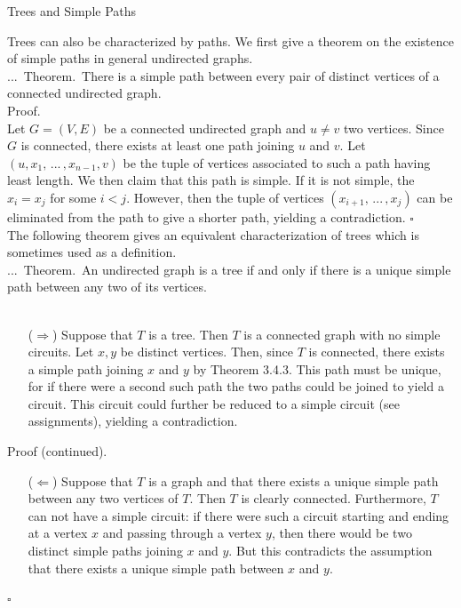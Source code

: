 \documentclass[smaller,hyperref={CJKbookmarks=true}]{beamer}
\newenvironment{PROOF}{{\noindent\!\sf\alert{Proof.}}\\}{\hfill$\square$\\}
\newcounter{zhuo}[subsection]
\renewcommand{\thezhuo}{\thesection.\thesubsection.\arabic{zhuo}}
\newenvironment{THEOREM}{\stepcounter{zhuo}\alert{\thezhuo.~Theorem.\,}}{}
\begin{document}
\begin{frame}{Trees and Simple Paths}
\begin{spacing}{1.1}
Trees can also be characterized by paths. We first give a theorem on the
existence of simple paths in general undirected graphs.\\[6pt]
\begin{THEOREM}
There is a simple path between every pair of distinct
vertices of a connected undirected graph.\\[6pt]
\end{THEOREM}
\begin{PROOF}
Let $G=(V,E)$ be a connected undirected graph and $u\neq v$ two vertices. Since $G$ is connected, there exists at least one path joining $u$ and $v$. Let $(u,x_1,\,...\,,x_{n-1},v)$ be the tuple of vertices associated to such a path
having least length. We then claim that this path is simple. If it is not
simple, the $x_i=x_j$ for some $i<j$. However, then the tuple of vertices $(x_{i+1},\,...\,,x_j)$ can be eliminated from the path to give a shorter path,
yielding a contradiction.
\end{PROOF}
\newpage
The following theorem gives an equivalent characterization of trees which
is sometimes used as a definition.\\[6pt]
\begin{THEOREM}
An undirected graph is a tree if and only if there is a
unique simple path between any two of its vertices.\\[6pt]
\end{THEOREM}
\begin{PROOF}
\begin{itemize}
  \item[($\Rightarrow$)] Suppose that $T$ is a tree. Then $T$ is a connected graph with no simple circuits. Let $x, y$ be distinct vertices. Then, since $T$ is connected, there exists a simple path joining $x$ and $y$ by Theorem 3.4.3. This path must be unique, for if there were a second such path the two paths could be joined to yield a circuit. This circuit could further be reduced to a simple circuit (see assignments), yielding a contradiction.
\end{itemize}
\newpage
\vspace*{7pt}
\alert{Proof (continued).}
\begin{itemize}
  \item[($\Leftarrow$)] Suppose that $T$ is a graph and that there exists a unique simple path
between any two vertices of $T$. Then $T$ is clearly connected.
Furthermore, $T$ can not have a simple circuit: if there were such a
circuit starting and ending at a vertex $x$ and passing through a vertex
$y$, then there would be two distinct simple paths joining $x$ and $y$. But
this contradicts the assumption that there exists a unique simple path
between $x$ and $y$.
\end{itemize}
\end{PROOF}
\end{spacing}
\end{frame}
\end{document}
